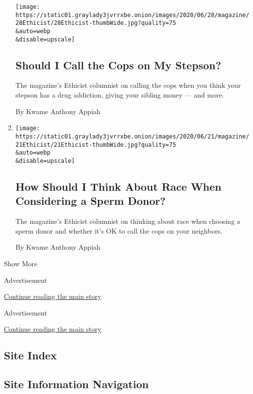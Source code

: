 \begin{enumerate}
  \texttt{[image: https://static01.graylady3jvrrxbe.onion/images/2020/06/28/magazine/28Ethicist/28Ethicist-thumbWide.jpg?quality=75\\\&auto=webp\\\&disable=upscale]}

  \hypertarget{should-i-call-the-cops-on-my-stepson}{%
  \subsection{Should I Call the Cops on My
  Stepson?}\label{should-i-call-the-cops-on-my-stepson}}

  The magazine's Ethicist columnist on calling the cops when you think
  your stepson has a drug addiction, giving your sibling money --- and
  more.

  By Kwame Anthony Appiah
\item
  \href{/2020/06/16/magazine/how-should-i-think-about-race-when-considering-a-sperm-donor.html}{}

  \texttt{[image: https://static01.graylady3jvrrxbe.onion/images/2020/06/21/magazine/21Ethicist/21Ethicist-thumbWide.jpg?quality=75\\\&auto=webp\\\&disable=upscale]}

  \hypertarget{how-should-i-think-about-race-when-considering-a-sperm-donor}{%
  \subsection{How Should I Think About Race When Considering a Sperm
  Donor?}\label{how-should-i-think-about-race-when-considering-a-sperm-donor}}

  The magazine's Ethicist columnist on thinking about race when choosing
  a sperm donor and whether it's OK to call the cops on your neighbors.

  By Kwame Anthony Appiah
\end{enumerate}

Show More

Advertisement

\protect\hyperlink{after-mid1}{Continue reading the main story}

Advertisement

\protect\hyperlink{after-mktg}{Continue reading the main story}

\hypertarget{site-index}{%
\subsection{Site Index}\label{site-index}}

\hypertarget{site-information-navigation}{%
\subsection{Site Information
Navigation}\label{site-information-navigation}}

